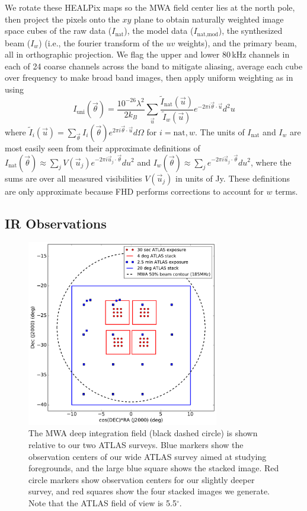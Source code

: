 \documentclass[numberedappendix]{emulateapj}
\begin{document}
We rotate these HEALPix maps so the MWA field center lies at the north pole, then project the pixels onto the $xy$ plane to obtain naturally weighted image space cubes of the raw data ($I_\text{nat}$), the model data ($I_\text{nat,mod}$), the synthesized beam ($I_w$) (i.e., the fourier transform of the $uv$ weights), and the primary beam, all in orthographic projection. We flag the upper and lower 80\,kHz channels in each of 24 coarse channels across the band to mitigate aliasing, average each cube over frequency to make broad band images, then apply uniform weighting as in \citet{dillonneben} using
\begin{equation}
\label{eqn:uniformweighting}
I_\text{uni}(\vec{\theta}) = \frac{10^{-26}\lambda^2}{2k_B } \sum_{\vec{u}} \frac{\tilde{I}_\text{nat}(\vec{u})}{\tilde{I}_w(\vec{u})} e^{-2\pi i \vec{\theta}\cdot\vec{u}}d^2u
\end{equation}
where $\tilde{I}_i(\vec{u}) = \sum_{\vec{\theta}} I_i(\vec{\theta}) e^{2\pi i\vec{\theta}\cdot\vec{u}} d\Omega$ for $i=\text{nat},w$. The units of $I_\text{nat}$ and $I_w$ are most easily seen from their approximate definitions of $I_\text{nat}(\vec{\theta})\approx\sum_j V(\vec{u}_j)e^{-2\pi i\vec{u}_j\cdot\vec{\theta}}du^2$ and $I_w(\vec{\theta})\approx\sum_j e^{-2\pi i\vec{u}_j\cdot\vec{\theta}}du^2$, where the sums are over all measured visibilities $V(\vec{u}_j)$ in units of Jy. These definitions are only approximate because FHD performs corrections to account for $w$ terms.

\subsection{IR Observations}

\begin{figure}[h]
\centering
\includegraphics[width=3.3in]{images/survey_overview.pdf}
\caption{The MWA deep integration field (black dashed circle) is shown relative to our two ATLAS surveys. Blue markers show the observation centers of our wide ATLAS survey aimed at studying foregrounds, and the large blue square shows the stacked image. Red circle markers show observation centers for our slightly deeper survey, and red squares show the four stacked images we generate. Note that the ATLAS field of view is 5.5$^\circ$.}
\label{fig:surveyoverview}
\end{figure}
\end{document}
